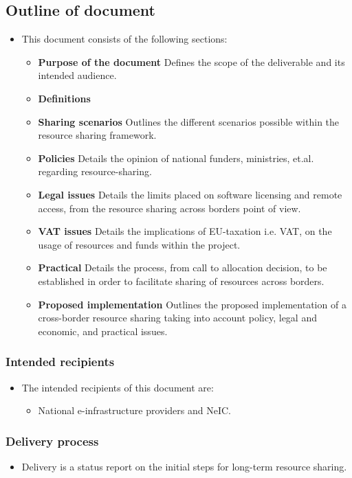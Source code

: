 \documentclass{article}
\newenvironment{MYitemize}{%
    \begin{itemize}}{\end{itemize}}
\newcommand{\bitm}{\begin{MYitemize}}
\newcommand{\eitm}{\end{MYitemize}}
\newcommand{\einfra}{e-infrastructure\xspace}
\begin{document}
\subsection{Outline of document}
\begin{itemize}
    \item []
This document consists of the following sections:

\begin{itemize}
\item \textbf{Purpose of the document} Defines the scope of the deliverable and its intended audience.
\item \textbf{Definitions}
\item \textbf{Sharing scenarios} Outlines the different scenarios possible within the resource sharing framework.
\item \textbf{Policies} Details the opinion of national funders, ministries, et.al. regarding resource-sharing.
\item \textbf{Legal issues} Details the limits placed on software licensing and remote access, from the resource sharing across borders point of view.
\item \textbf{VAT issues} Details the implications of EU-taxation i.e. VAT, on the usage of resources and funds within the project. 
\item \textbf{Practical} Details the process, from call to allocation decision, to be established in order to facilitate sharing of resources across borders.
\item \textbf{Proposed implementation} Outlines the proposed implementation of a cross-border resource sharing taking into account policy, legal and economic, and practical issues.
\end{itemize}
\end{itemize}


\subsubsection{Intended recipients}
\begin{itemize}
    \item []
    The intended recipients of this document are:
\bitm
\item[] National \einfra providers and NeIC.
\eitm
\end{itemize}
\subsubsection{Delivery process}
\begin{itemize}
    \item []
    Delivery is a status report on the initial steps for long-term resource sharing.
\end{itemize}
\end{document}
